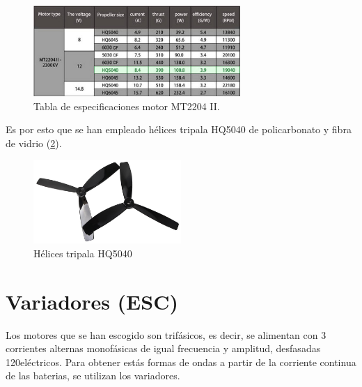 \begin{figure}[htb!]
	\centering
	\includegraphics[width=0.7\textwidth]{hardware/MT2203_Table.jpeg}
	\caption{Tabla de especificaciones motor MT2204 II. }
	\label{hardware:motoresTabla}
\end{figure}

Es por esto que se han empleado hélices tripala HQ5040 de policarbonato y fibra de vidrio (\cref{hardware:helice}).

\begin{figure}[htb!]
	\centering
	\includegraphics[width=0.5\textwidth]{hardware/helices.jpeg}
	\caption{Hélices tripala HQ5040}
	\label{hardware:helice}
\end{figure}

\section{Variadores (ESC)}


Los motores  que se han escogido son trifásicos, es decir, se alimentan con 3 corrientes alternas monofásicas de igual frecuencia y amplitud, desfasadas 120\grad \;eléctricos. Para obtener estás formas de ondas a partir de la corriente continua de las baterias, se utilizan los variadores.

